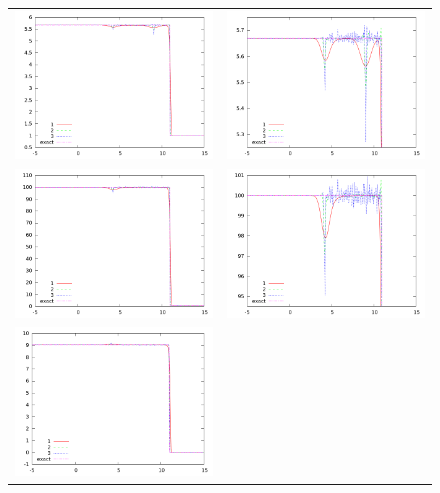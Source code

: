 \documentclass[letterpaper,12pt]{article}
\begin{document}
\begin{figure}[h]
  \begin{center}
	\begin{tabular}{cc}
      \includegraphics[width=.4\textwidth]{den_T10.png} &
	  \includegraphics[width=.4\textwidth]{den10zoom.png} \\
	  \includegraphics[width=.4\textwidth]{prs_T10.png} &	
	  \includegraphics[width=.4\textwidth]{prs10zoom.png} \\
      \includegraphics[width=.4\textwidth]{vel_T10.png} &	

\end{tabular}
\end{center}
\end{figure}
\end{document}
